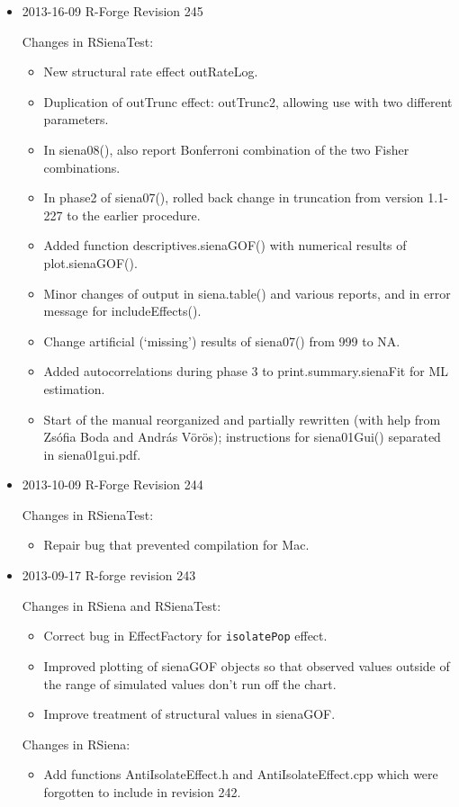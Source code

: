 \documentclass[a4paper,fleqn,11pt]{article}
\newcommand{\+}{\, + \,}
\newcommand{\sfn}[1]{\textsf{#1}}
\begin{document}
{\begin{small}
\begin{itemize}
\begin{itemize}
  \end{itemize}

\item 2013-16-09 R-Forge Revision 245

Changes in RSienaTest:
\begin{itemize}
   \item New structural rate effect \sfn{outRateLog}.
   \item Duplication of \sfn{outTrunc} effect: \sfn{outTrunc2}, allowing use
    with two different parameters.
   \item In \sfn{siena08()}, also report Bonferroni combination
     of the two Fisher combinations.
   \item In phase2 of \sfn{siena07()}, rolled back change in truncation
     from version 1.1-227 to the earlier procedure.
   \item Added function \sfn{descriptives.sienaGOF()} with numerical results
   of \sfn{plot.sienaGOF()}.
   \item Minor changes of output in \sfn{siena.table()} and various reports,
    and in error message for \sfn{includeEffects()}.
   \item  Change artificial (`missing') results of \sfn{siena07()} from 999
    to NA.
   \item Added autocorrelations during phase 3 to \sfn{print.summary.sienaFit}
   for ML estimation.
   \item Start of the manual reorganized and partially rewritten (with help from
     Zs\'{o}fia Boda and Andr\'{a}s V\"{o}r\"{o}s); instructions for
     \sfn{siena01Gui()} separated in siena01gui.pdf.
  \end{itemize}

\item 2013-10-09 R-Forge Revision 244

Changes in RSienaTest:

\begin{itemize}
\item Repair bug that prevented compilation for Mac.
\end{itemize}

\item 2013-09-17 R-forge revision 243

Changes in RSiena and RSienaTest:
  \begin{itemize}
   \item Correct bug in \sfn{EffectFactory} for \texttt{isolatePop} effect.
   \item Improved plotting of \sfn{sienaGOF} objects so that observed values
     outside of the range of simulated values don't run off the chart.
   \item Improve treatment of structural values in \sfn{sienaGOF}.
  \end{itemize}
Changes in RSiena:
  \begin{itemize}
   \item Add functions \sfn{AntiIsolateEffect.h} and \sfn{AntiIsolateEffect.cpp}
     which were forgotten to include in revision 242.
  \end{itemize}


\end{itemize}
\end{small}}
\end{document}
